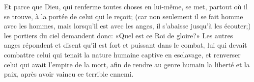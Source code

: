 Et parce que Dieu, qui renferme toutes choses en lui-même,
	se met, partout où il se trouve, à la portée de celui qui le reçoit;
	(car non seulement il se fait homme avec les hommes,
	mais lorsqu’il est avec les anges, il s’abaisse jusqu’à les écouter;)
	les portiers du ciel demandent donc: «Quel est ce Roi de gloire?»
Les autres anges répondent et disent qu’il est fort et puissant dans le combat,
	lui qui devait combattre celui qui tenait la nature humaine
		captive en esclavage,
	et renverser celui qui avait l’empire de la mort,
	afin de rendre au genre humain la liberté et la paix,
	après avoir vaincu ce terrible ennemi.
